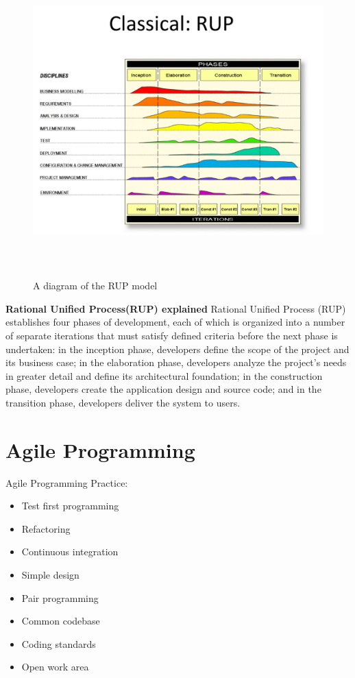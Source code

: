 \documentclass{report}
\begin{document}
\begin{figure}[h]
\begin{center} 
    \includegraphics[scale=0.8,width = 15cm, height = 12cm]{images/RUP.pdf}
    \caption{A diagram of the RUP model}
\end{center}
\end{figure}

\textbf{Rational Unified Process(RUP) explained \newline} 
Rational Unified Process (RUP) establishes four phases of development, each of which is organized into a number of separate iterations that must satisfy defined criteria before the next phase is undertaken: in the inception phase, developers define the scope of the project and its business case; in the elaboration phase, developers analyze the project's needs in greater detail and define its architectural foundation; in the construction phase, developers create the application design and source code; and in the transition phase, developers deliver the system to users. 


\section{Agile Programming}
Agile Programming Practice:
\begin{itemize}
\item Test first programming
\item Refactoring
\item Continuous integration
\item Simple design
\item Pair programming
\item Common codebase
\item Coding standards
\item Open work area
\end{itemize}
\end{document}
